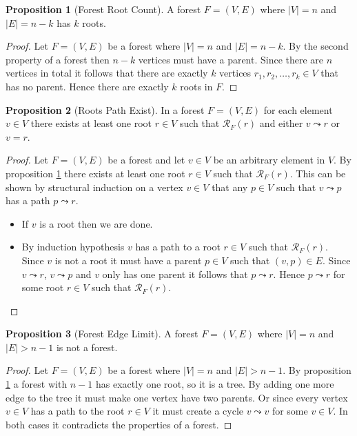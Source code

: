 \documentclass[a4paper,12pt]{article}
\theoremstyle{definition}
\newtheorem{proposition}{Proposition}[section]
\begin{document}
\begin{proposition}[Forest Root Count]\label{prop:forest-root-count}
    A forest $F = (V, E)$ where $|V| = n$ and $|E| = n - k$ has $k$ roots.
\end{proposition}

\begin{proof}
    Let $F = (V, E)$ be a forest where $|V| = n$ and $|E| = n - k$. By the
    second property of a forest then $n - k$ vertices must have a parent. Since
    there are $n$ vertices in total it follows that there are exactly $k$
    vertices $r_1, r_2, \ldots, r_k \in V$ that has no parent. Hence there are
    exactly $k$ roots in $F$.
\end{proof}

\begin{proposition}[Roots Path Exist]\label{prop:roots-path-exist}
    In a forest $F = (V, E)$ for each element $v \in V$ there exists at least
    one root $r \in V$ such that $\mathcal{R}_F(r)$ and either $v \leadsto r$ or
    $v = r$.
\end{proposition}

\begin{proof}
    Let $F = (V, E)$ be a forest and let $v \in V$ be an arbitrary element in
    $V$. By proposition \ref{prop:forest-root-count} there exists at least one
    root $r \in V$ such that $\mathcal{R}_F(r)$. This can be shown by structural
    induction on a vertex $v \in V$ that any $p \in V$ such that $v \leadsto p$
    has a path $p \leadsto r$.
    \begin{itemize}
        \item If $v$ is a root then we are done.
        \item By induction hypothesis $v$ has a path to a root $r \in V$ such
        that $\mathcal{R}_F(r)$. Since $v$ is not a root it must have a parent
        $p \in V$ such that $(v, p) \in E$. Since $v \leadsto r$, $v \leadsto p$
        and $v$ only has one parent it follows that $p \leadsto r$. Hence $p
        \leadsto r$ for some root $r \in V$ such that $\mathcal{R}_F(r)$.
    \end{itemize}
\end{proof}

\begin{proposition}[Forest Edge Limit]\label{prop:forest-edge-limit}
    A forest $F = (V, E)$ where $|V| = n$ and $|E| > n - 1$ is not a forest.
\end{proposition}

\begin{proof}
    Let $F = (V, E)$ be a forest where $|V| = n$ and $|E| > n - 1$. By
    proposition \ref{prop:forest-root-count} a forest with $n - 1$ has exactly
    one root, so it is a tree. By adding one more edge to the tree it must make
    one vertex have two parents. Or since every vertex $v \in V$ has a path to
    the root $r \in V$ it must create a cycle $v \leadsto v$ for some $v \in V$.
    In both cases it contradicts the properties of a forest.
\end{proof}
\end{document}
